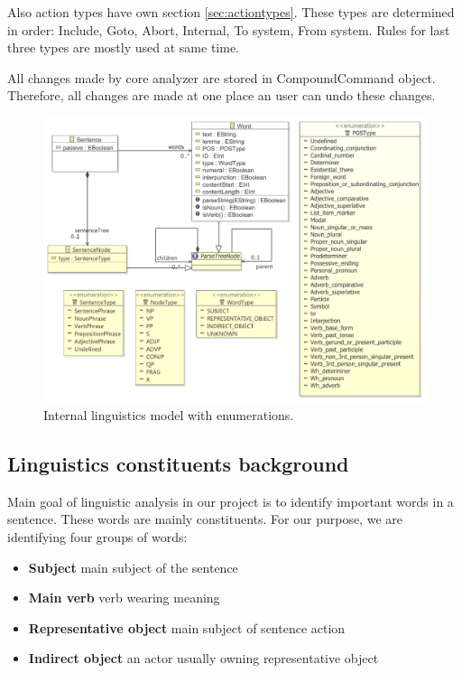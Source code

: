 Also action types have own section \ref{sec:actiontypes}. These types are determined in order: Include, Goto, Abort, Internal, To system, From system. Rules for last three types are mostly used at same time.

All changes made by core analyzer are stored in CompoundCommand object. Therefore, all changes are made at one place an user can undo these changes.

\begin{figure}[ht]
  \centering
  \includegraphics[width=\textwidth]{images/ReprotoolLingModel}
  \caption{Internal linguistics model with enumerations.}
  \label{fig:ReprotoolLingModel}
\end{figure}

\subsection{Linguistics constituents background}
\label{sec:lingbackground}
Main goal of linguistic analysis in our project is to identify important words in a sentence. These words are mainly constituents. For our purpose, we are identifying four groups of words:

\begin{itemize}
\item {\bf Subject} main subject of the sentence
\item {\bf Main verb} verb wearing meaning
\item {\bf Representative object} main subject of sentence action
\item {\bf Indirect object} an actor usually owning representative object
\end{itemize}

